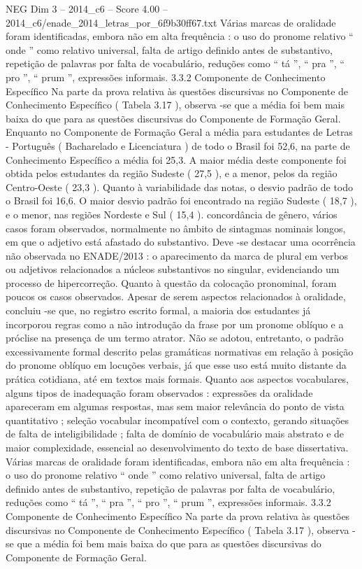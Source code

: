 \begin{textsample}{NEG Dim 3 – 2014\_c6 – Score 4.00 – 2014\_c6/enade\_2014\_letras\_por\_6f9b30ff67.txt}
Várias marcas de oralidade foram identificadas, embora não em alta frequência : o uso do pronome relativo “ onde ” como relativo universal, falta de artigo definido antes de substantivo, repetição de palavras por falta de vocabulário, reduções como “ tá ”, “ pra ”, “ pro ”, “ prum ”, expressões informais. 3.3.2 Componente de Conhecimento Específico Na parte da prova relativa às questões discursivas no Componente de Conhecimento Específico ( Tabela 3.17 ), observa -se que a média foi bem mais baixa do que para as questões discursivas do Componente de Formação Geral.
Enquanto no Componente de Formação Geral a média para estudantes de Letras - Português ( Bacharelado e Licenciatura ) de todo o Brasil foi 52,6, na parte de Conhecimento Específico a média foi 25,3.
A maior média deste componente foi obtida pelos estudantes da região Sudeste ( 27,5 ), e a menor, pelos da região Centro-Oeste ( 23,3 ).
Quanto à variabilidade das notas, o desvio padrão de todo o Brasil foi 16,6.
O maior desvio padrão foi encontrado na região Sudeste ( 18,7 ), e o menor, nas regiões Nordeste e Sul ( 15,4 ). concordância de gênero, vários casos foram observados, normalmente no âmbito de sintagmas nominais longos, em que o adjetivo está afastado do substantivo.
Deve -se destacar uma ocorrência não observada no ENADE/2013 : o aparecimento da marca de plural em verbos ou adjetivos relacionados a núcleos substantivos no singular, evidenciando um processo de hipercorreção.
Quanto à questão da colocação pronominal, foram poucos os casos observados.
Apesar de serem aspectos relacionados à oralidade, concluiu -se que, no registro escrito formal, a maioria dos estudantes já incorporou regras como a não introdução da frase por um pronome oblíquo e a próclise na presença de um termo atrator.
Não se adotou, entretanto, o padrão excessivamente formal descrito pelas gramáticas normativas em relação à posição do pronome oblíquo em locuções verbais, já que esse uso está muito distante da prática cotidiana, até em textos mais formais.
Quanto aos aspectos vocabulares, alguns tipos de inadequação foram observados : expressões da oralidade apareceram em algumas respostas, mas sem maior relevância do ponto de vista quantitativo ; seleção vocabular incompatível com o contexto, gerando situações de falta de inteligibilidade ; falta de domínio de vocabulário mais abstrato e de maior complexidade, essencial ao desenvolvimento do texto de base dissertativa.
Várias marcas de oralidade foram identificadas, embora não em alta frequência : o uso do pronome relativo “ onde ” como relativo universal, falta de artigo definido antes de substantivo, repetição de palavras por falta de vocabulário, reduções como “ tá ”, “ pra ”, “ pro ”, “ prum ”, expressões informais. 3.3.2 Componente de Conhecimento Específico Na parte da prova relativa às questões discursivas no Componente de Conhecimento Específico ( Tabela 3.17 ), observa -se que a média foi bem mais baixa do que para as questões discursivas do Componente de Formação Geral.

\end{textsample}
